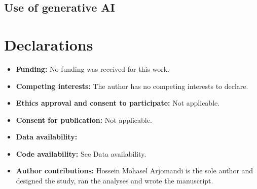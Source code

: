 \documentclass[pdflatex,sn-basic]{sn-jnl}
\begin{document}
\title[\papershorttitle]{\papertitle}

\author*[1]{ }

\abstract{}

\keywords{\paperkeywords}

\maketitle




\subsection{Use of generative AI}\label{sec:ai-use}





\backmatter

\section*{Declarations}\label{sec:availability}

\begin{itemize}
\item \textbf{Funding:} No funding was received for this work.
\item \textbf{Competing interests:} The author has no competing interests to declare.
\item \textbf{Ethics approval and consent to participate:} Not applicable.
\item \textbf{Consent for publication:} Not applicable.
\item \textbf{Data availability:} 
\item \textbf{Code availability:} See Data availability.
\item \textbf{Author contributions:} Hossein Mohasel Arjomandi is the sole author and designed the study, ran the analyses and wrote the manuscript.
\end{itemize}


\end{document}
